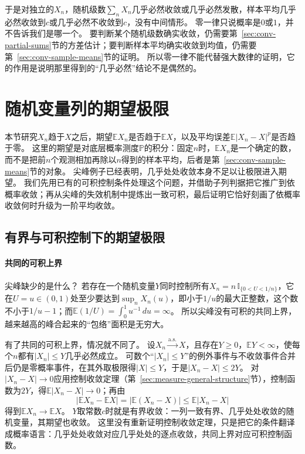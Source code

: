 于是对独立的$X_n$，随机级数$\sum_nX_n$几乎必然收敛或几乎必然发散，样本平均几乎必然收敛到$c$或几乎必然不收敛到$c$，没有中间情形。
零一律只说概率是$0$或$1$，并不告诉我们是哪一个。
要判断某个随机级数确实收敛，仍需要第~\ref{sec:conv-partial-sums}节的方差估计；要判断样本平均确实收敛到均值，仍需要第~\ref{sec:conv-sample-means}节的证明。
所以零一律不能代替强大数律的证明，它的作用是说明那里得到的“几乎必然”结论不是偶然的。

\section{随机变量列的期望极限}
\label{sec:conv-expectation-limits}

本节研究$X_n$趋于$X$之后，期望$\mathbb EX_n$是否趋于$\mathbb EX$，以及平均误差$\mathbb E|X_n-X|^p$是否趋于零。
这里的期望是对底层概率测度$\mathbb P$的积分：固定$n$时，$\mathbb EX_n$是一个确定的数，而不是把前$n$个观测相加再除以$n$得到的样本平均，后者是第~\ref{sec:conv-sample-means}节的对象。
尖峰例子已经表明，几乎处处收敛本身不足以让极限进入期望。
我们先用已有的可积控制条件处理这个问题，并借助子列判据把它推广到依概率收敛；再从尖峰的失效机制中提炼出一致可积，最后证明它恰好刻画了依概率收敛何时升级为一阶平均收敛。

\subsection{有界与可积控制下的期望极限}

\paragraph{共同的可积上界}
尖峰缺少的是什么？
若存在一个随机变量$Y$同时控制所有$X_n=n\,\mathbb I_{\{0<U<1/n\}}$，它在$U=u\in(0,1)$处至少要达到$\sup_nX_n(u)$，即小于$1/u$的最大正整数，这个数不小于$1/u-1$；而$\mathbb E(1/U)=\int_0^1u^{-1}\,du=\infty$。
所以尖峰没有可积的共同上界，越来越高的峰合起来的“包络”面积是无穷大。

有了共同的可积上界，情况就不同了。
设$X_n\xrightarrow{\mathrm{a.s.}}X$，且存在$Y\geq0$，$\mathbb EY<\infty$，使每个$n$都有$|X_n|\leq Y$几乎必然成立。
可数个“$|X_n|\leq Y$”的例外事件与不收敛事件合并后仍是零概率事件，在其外取极限得$|X|\leq Y$，于是$|X_n-X|\leq2Y$。
对$|X_n-X|\to0$应用控制收敛定理（第~\ref{sec:measure-general-structure}节），控制函数为$2Y$，得$\mathbb E|X_n-X|\to0$；再由
\[
  |\mathbb EX_n-\mathbb EX|=|\mathbb E(X_n-X)|\leq\mathbb E|X_n-X|
\]
得到$\mathbb EX_n\to\mathbb EX$。
$Y$取常数$c$时就是有界收敛：一列一致有界、几乎处处收敛的随机变量，其期望也收敛。
这里没有重新证明控制收敛定理，只是把它的条件翻译成概率语言：几乎处处收敛对应几乎处处的逐点收敛，共同上界对应可积控制函数。

